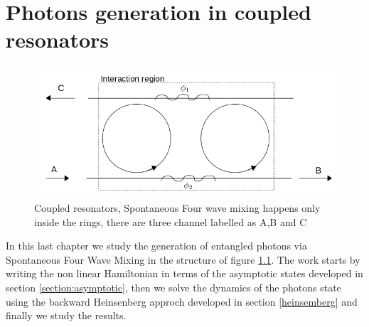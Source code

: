 \chapter{Photons generation in coupled resonators}
\begin{figure}
\centering
\includegraphics[width = \textwidth]{img/system}
\caption{Coupled resonators, Spontaneous Four wave mixing happens only inside the rings, there are three channel labelled as A,B and C}
\label{couplesstructure}
\end{figure}

In this last chapter we study the generation of entangled photons via Spontaneous Four Wave Mixing in the structure of figure \ref{couplesstructure}. The work starts by writing the non linear Hamiltonian in terms of the asymptotic states developed in section \ref{section:asymptotic}, then we solve the dynamics of the photons state using the backward Heinsenberg approch developed in section \ref{heinsemberg} and finally we study the results.\\

